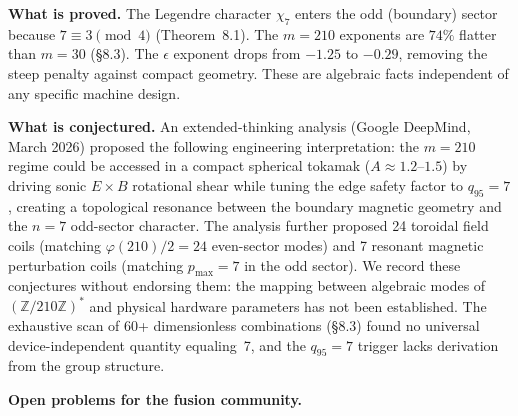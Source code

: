 \documentclass[11pt,letterpaper]{article}
\theoremstyle{definition}
\begin{document}
\medskip
\textbf{What is proved.} The Legendre character $\chi_7$ enters the odd (boundary) sector because $7 \equiv 3 \pmod{4}$ (Theorem~8.1). The $m = 210$ exponents are $74\%$ flatter than $m = 30$ (\S8.3). The $\epsilon$ exponent drops from $-1.25$ to $-0.29$, removing the steep penalty against compact geometry. These are algebraic facts independent of any specific machine design.

\begin{sloppypar}
\medskip
\textbf{What is conjectured.} An extended-thinking analysis (Google DeepMind, March 2026) proposed the following engineering interpretation: the $m = 210$ regime could be accessed in a compact spherical tokamak ($A \approx 1.2$--$1.5$) by driving sonic $E \times B$ rotational shear while tuning the edge safety factor to $q_{95} = 7$, creating a topological resonance between the boundary magnetic geometry and the $n = 7$ odd-sector character. The analysis further proposed 24 toroidal field coils (matching $\varphi(210)/2 = 24$ even-sector modes) and 7 resonant magnetic perturbation coils (matching $p_{\text{max}} = 7$ in the odd sector). We record these conjectures without endorsing them: the mapping between algebraic modes of $(\mathbb{Z}/210\mathbb{Z})^*$ and physical hardware parameters has not been established. The exhaustive scan of 60+ dimensionless combinations (\S8.3) found no universal device-independent quantity equaling~7, and the $q_{95} = 7$ trigger lacks derivation from the group structure.
\end{sloppypar}

\medskip
\textbf{Open problems for the fusion community.}
\end{document}
